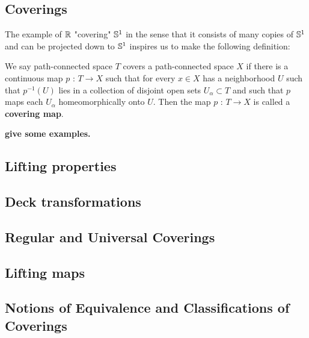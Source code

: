 \documentclass[11pt]{article}
\begin{document}
\subsection{Coverings}

The example of $\mathbb{R}$ "covering" $\mathbb{S}^1$ in the sense that it consists of many copies of $\mathbb{S}^1$ and can be projected down to $\mathbb{S}^1$ inspires us to make the following definition:  

\begin{redbox}
  \begin{definition}
    We say path-connected space $T$ covers a path-connected space $X$ if there is a continuous map $p \text{ : } T  \rightarrow X$ such that for every $x \in X$ has a neighborhood $U$ such that $p^{-1}(U)$ lies in a collection of disjoint open sets $U_{\alpha} \subset T$ and such that $p$ maps each $U_{\alpha}$ homeomorphically onto $U$. Then the map $p \text{ : } T \rightarrow X $ is called a \textbf{covering map}.
  \end{definition}
\end{redbox}

\begin{example}
  \textbf{give some examples.}
\end{example}

\subsection{Lifting properties}




\subsection{Deck transformations}

\subsection{Regular and Universal Coverings}

\subsection{Lifting maps}

\subsection{Notions of Equivalence and Classifications of Coverings}
\end{document}
